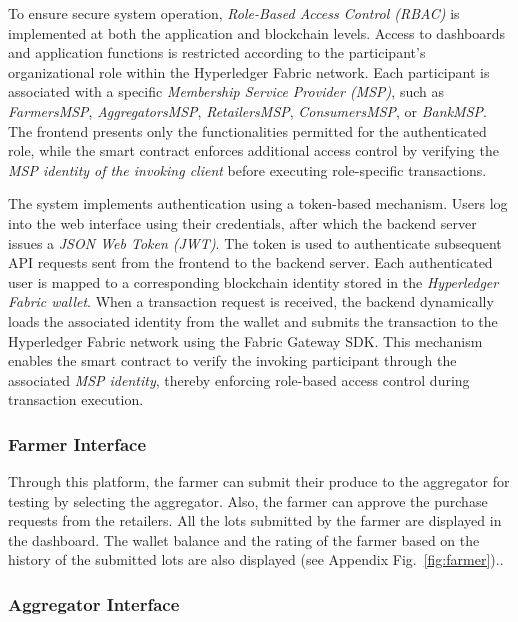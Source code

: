 \documentclass[12pt]{article}
\begin{document}
	To ensure secure system operation, \textit{Role-Based Access Control (RBAC)} is implemented at both the application and blockchain levels. Access to dashboards and application functions is restricted according to the participant's organizational role within the Hyperledger Fabric network. Each participant is associated with a specific \textit{Membership Service Provider (MSP)}, such as \textit{FarmersMSP}, \textit{AggregatorsMSP}, \textit{RetailersMSP}, \textit{ConsumersMSP}, or \textit{BankMSP}. The frontend presents only the functionalities permitted for the authenticated role, while the smart contract enforces additional access control by verifying the \textit{MSP identity of the invoking client} before executing role-specific transactions.
	
	The system implements authentication using a token-based mechanism. Users log into the web interface using their credentials, after which the backend server issues a \textit{JSON Web Token (JWT)}. The token is used to authenticate subsequent API requests sent from the frontend to the backend server. Each authenticated user is mapped to a corresponding blockchain identity stored in the \textit{Hyperledger Fabric wallet}. When a transaction request is received, the backend dynamically loads the associated identity from the wallet and submits the transaction to the Hyperledger Fabric network using the Fabric Gateway SDK. This mechanism enables the smart contract to verify the invoking participant through the associated \textit{MSP identity}, thereby enforcing role-based access control during transaction execution.
	
	\subsubsection{Farmer Interface}
	
	Through this platform, the farmer can submit their produce to the aggregator for testing by selecting the aggregator. Also, the farmer can approve the purchase requests from the retailers. All the lots submitted by the farmer are displayed in the dashboard. The wallet balance and the rating of the farmer based on the history of the submitted lots are also displayed (see Appendix Fig.~\ref{fig:farmer})..
	
	
	
	\subsubsection{Aggregator Interface}
	
\end{document}
